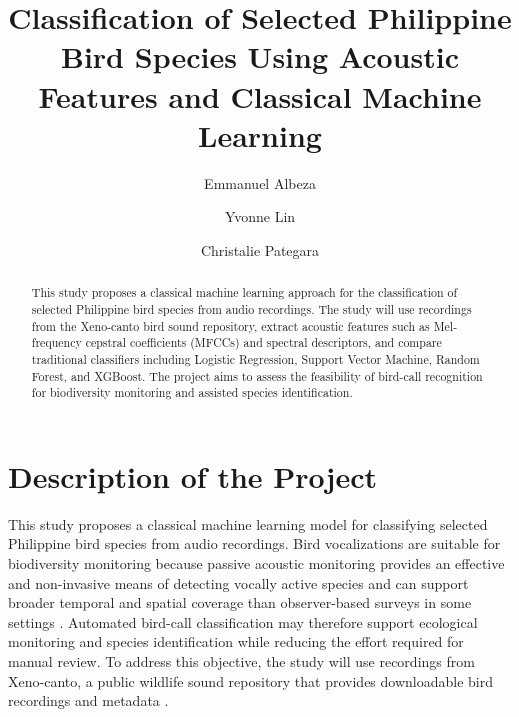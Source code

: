 \documentclass[runningheads]{llncs}
\begin{document}
\title{Classification of Selected Philippine Bird Species Using Acoustic Features and Classical Machine Learning}

\author{Emmanuel Albeza \and Yvonne Lin \and Christalie Pategara}

\maketitle

\begin{abstract}
This study proposes a classical machine learning approach for the classification of selected Philippine bird species from audio recordings. The study will use recordings from the Xeno-canto bird sound repository, extract acoustic features such as Mel-frequency cepstral coefficients (MFCCs) and spectral descriptors, and compare traditional classifiers including Logistic Regression, Support Vector Machine, Random Forest, and XGBoost. The project aims to assess the feasibility of bird-call recognition for biodiversity monitoring and assisted species identification.
\end{abstract}

\section{Description of the Project}

This study proposes a classical machine learning model for classifying selected Philippine bird species from audio recordings. Bird vocalizations are suitable for biodiversity monitoring because passive acoustic monitoring provides an effective and non-invasive means of detecting vocally active species and can support broader temporal and spatial coverage than observer-based surveys in some settings \cite{szymanski2021,biffi2024,mosikidi2023}. Automated bird-call classification may therefore support ecological monitoring and species identification while reducing the effort required for manual review. To address this objective, the study will use recordings from Xeno-canto, a public wildlife sound repository that provides downloadable bird recordings and metadata \cite{xenocanto}.
\end{document}
